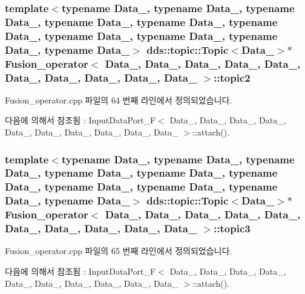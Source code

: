 \subsubsection[{\texorpdfstring{topic2}{topic2}}]{\setlength{\rightskip}{0pt plus 5cm}template$<$typename Data\+\_, typename Data\+\_, typename Data\+\_, typename Data\+\_, typename Data\+\_, typename Data\+\_, typename Data\+\_, typename Data\+\_, typename Data\+\_, typename Data\+\_$>$ dds\+::topic\+::\+Topic$<$Data\+\_$>$$\ast$ {\bf Fusion\+\_\+operator}$<$ Data\+\_, Data\+\_, Data\+\_, Data\+\_, Data\+\_, Data\+\_, Data\+\_, Data\+\_, Data\+\_, Data\+\_ $>$\+::topic2}\hypertarget{classFusion__operator_a156ba17873325c431689c47f2f2d6296}{}\label{classFusion__operator_a156ba17873325c431689c47f2f2d6296}


Fusion\+\_\+operator.\+cpp 파일의 64 번째 라인에서 정의되었습니다.



다음에 의해서 참조됨 \+:  Input\+Data\+Port\+\_\+\+F$<$ Data\+\_, Data\+\_, Data\+\_, Data\+\_, Data\+\_, Data\+\_, Data\+\_, Data\+\_, Data\+\_, Data\+\_ $>$\+::attach().

\subsubsection[{\texorpdfstring{topic3}{topic3}}]{\setlength{\rightskip}{0pt plus 5cm}template$<$typename Data\+\_, typename Data\+\_, typename Data\+\_, typename Data\+\_, typename Data\+\_, typename Data\+\_, typename Data\+\_, typename Data\+\_, typename Data\+\_, typename Data\+\_$>$ dds\+::topic\+::\+Topic$<$Data\+\_$>$$\ast$ {\bf Fusion\+\_\+operator}$<$ Data\+\_, Data\+\_, Data\+\_, Data\+\_, Data\+\_, Data\+\_, Data\+\_, Data\+\_, Data\+\_, Data\+\_ $>$\+::topic3}\hypertarget{classFusion__operator_af90486f24e7f5e82364b20ad9d448595}{}\label{classFusion__operator_af90486f24e7f5e82364b20ad9d448595}


Fusion\+\_\+operator.\+cpp 파일의 65 번째 라인에서 정의되었습니다.



다음에 의해서 참조됨 \+:  Input\+Data\+Port\+\_\+\+F$<$ Data\+\_, Data\+\_, Data\+\_, Data\+\_, Data\+\_, Data\+\_, Data\+\_, Data\+\_, Data\+\_, Data\+\_ $>$\+::attach().

